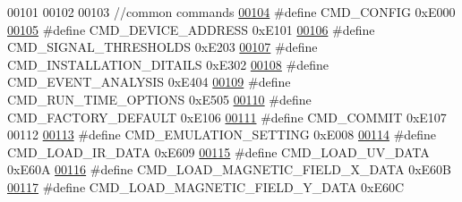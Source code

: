 \begin{DoxyCode}
00101 
00102 
00103 \textcolor{comment}{//common commands}
\hypertarget{a00021_source_l00104}{}\hyperlink{a00021_aa87bfa4fccf7f7a4fc45afb1966a655f}{00104} \textcolor{preprocessor}{#define CMD\_CONFIG                                              0xE000}
\hypertarget{a00021_source_l00105}{}\hyperlink{a00021_a7c6a5f4023cb02d02f2ded23147be425}{00105} \textcolor{preprocessor}{#define CMD\_DEVICE\_ADDRESS                                      0xE101}
\hypertarget{a00021_source_l00106}{}\hyperlink{a00021_ac361dc1b32c1036394be0fd7de1182ca}{00106} \textcolor{preprocessor}{#define CMD\_SIGNAL\_THRESHOLDS                                   0xE203}
\hypertarget{a00021_source_l00107}{}\hyperlink{a00021_af91ff280feea1f52e3bdd7f0f556d153}{00107} \textcolor{preprocessor}{#define CMD\_INSTALLATION\_DITAILS                                0xE302}
\hypertarget{a00021_source_l00108}{}\hyperlink{a00021_a3a15793e3ab7817f2429edf04de693a0}{00108} \textcolor{preprocessor}{#define CMD\_EVENT\_ANALYSIS                                      0xE404}
\hypertarget{a00021_source_l00109}{}\hyperlink{a00021_a1d8673a7ca545f3e382fc538f543ab72}{00109} \textcolor{preprocessor}{#define CMD\_RUN\_TIME\_OPTIONS                                    0xE505}
\hypertarget{a00021_source_l00110}{}\hyperlink{a00021_a8ad7dae51114833acbb665d703d8ffeb}{00110} \textcolor{preprocessor}{#define CMD\_FACTORY\_DEFAULT                                     0xE106}
\hypertarget{a00021_source_l00111}{}\hyperlink{a00021_a7df85bf97a6a032220d7a71c78be5206}{00111} \textcolor{preprocessor}{#define CMD\_COMMIT                                              0xE107}
00112 
\hypertarget{a00021_source_l00113}{}\hyperlink{a00021_a230386ac00f9c01793857101e1680324}{00113} \textcolor{preprocessor}{#define CMD\_EMULATION\_SETTING                                   0xE008}
\hypertarget{a00021_source_l00114}{}\hyperlink{a00021_a8c7ce698ee79d20e30eb0ac08f0d9abc}{00114} \textcolor{preprocessor}{#define CMD\_LOAD\_IR\_DATA                                        0xE609}
\hypertarget{a00021_source_l00115}{}\hyperlink{a00021_a8904f57ef5850374dbcdbe67eb8a5543}{00115} \textcolor{preprocessor}{#define CMD\_LOAD\_UV\_DATA                                        0xE60A}
\hypertarget{a00021_source_l00116}{}\hyperlink{a00021_a9e5d9d302e44daccbe233d321696b12c}{00116} \textcolor{preprocessor}{#define CMD\_LOAD\_MAGNETIC\_FIELD\_X\_DATA                          0xE60B}
\hypertarget{a00021_source_l00117}{}\hyperlink{a00021_ace011e2ba41b184650e8bd0ddbfa00d2}{00117} \textcolor{preprocessor}{#define CMD\_LOAD\_MAGNETIC\_FIELD\_Y\_DATA                          0xE60C}

\end{DoxyCode}
